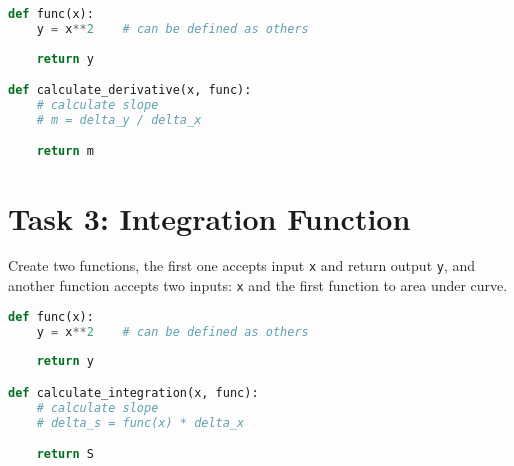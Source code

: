 \documentclass[11pt]{article}
\begin{document}
\begin{lstlisting}[language=Python]
def func(x):
    y = x**2    # can be defined as others
    
    return y

def calculate_derivative(x, func):
    # calculate slope
    # m = delta_y / delta_x

    return m
\end{lstlisting}

\begin{tcolorbox}[colback=black!10!white, colframe=black!75!white, title=\textbf{Answer}]
    \vspace{3cm}
\end{tcolorbox} 

\section*{Task 3: Integration Function}
Create two functions, the first one accepts input \texttt{x} and return output \texttt{y}, and another function accepts two inputs: \texttt{x} and the first function to area under curve.

\begin{lstlisting}[language=Python]
def func(x):
    y = x**2    # can be defined as others
    
    return y

def calculate_integration(x, func):
    # calculate slope
    # delta_s = func(x) * delta_x

    return S
\end{lstlisting}

\begin{tcolorbox}[colback=black!10!white, colframe=black!75!white, title=\textbf{Answer}]
    \vspace{3cm}
\end{tcolorbox} 
\end{document}
